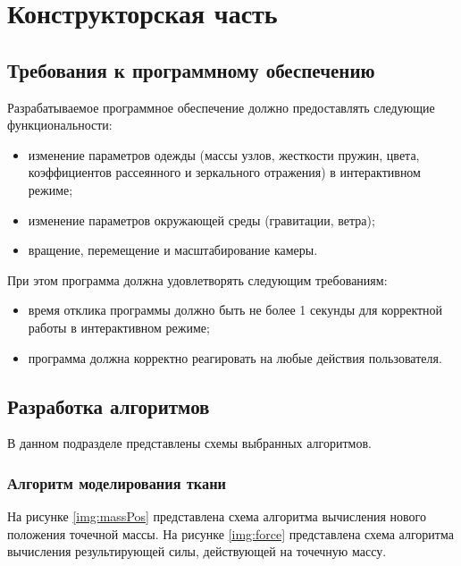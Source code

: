 \chapter{Конструкторская часть}

\section{Требования к программному обеспечению}

Разрабатываемое программное обеспечение должно предоставлять следующие
функциональности:
\begin{itemize}
    \item изменение параметров одежды (массы узлов, жесткости пружин, цвета,
        коэффициентов рассеянного и зеркального отражения) в интерактивном
        режиме;
    \item изменение параметров окружающей среды (гравитации, ветра);
    \item вращение, перемещение и масштабирование камеры.
\end{itemize}

При этом программа должна удовлетворять следующим требованиям:
\begin{itemize}
    \item время отклика программы должно быть не более 1 секунды для корректной
        работы в интерактивном режиме;
    \item программа должна корректно реагировать на любые действия пользователя.
\end{itemize}

\section{Разработка алгоритмов}

В данном подразделе представлены схемы выбранных алгоритмов.

\subsection{Алгоритм моделирования ткани}

На рисунке \ref{img:massPos} представлена схема алгоритма вычисления нового
положения точечной массы. На рисунке \ref{img:force} представлена схема
алгоритма вычисления результирующей силы, действующей на точечную массу.



